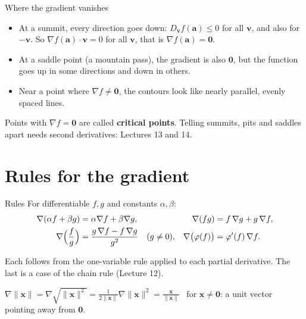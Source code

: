\documentclass[10pt]{wosm-slides}
\newcommand{\norm}[1]{\lVert #1 \rVert}
\newcommand{\vx}{\mathbf{x}}
\newcommand{\va}{\mathbf{a}}
\DeclareRobustCommand{\vv}{\mathbf{v}}
\begin{document}
\begin{frame}{Where the gradient vanishes}
  \begin{itemize}
    \item At a summit, every direction goes down: $D_\vv f(\va) \le 0$ for all $\vv$, and also for
      $-\vv$. So $\nabla f(\va) \cdot \vv = 0$ for all $\vv$, that is $\nabla f(\va) = \mathbf 0$.
    \item At a saddle point (a mountain pass), the gradient is also $\mathbf 0$, but the function
      goes up in some directions and down in others.
    \item Near a point where $\nabla f \ne \mathbf 0$, the contours look like nearly parallel,
      evenly spaced lines.
  \end{itemize}
  \pause
  \begin{remark}
    Points with $\nabla f = \mathbf 0$ are called \textbf{critical points}. Telling summits, pits and
    saddles apart needs second derivatives: Lectures 13 and 14.
  \end{remark}
\end{frame}

\section{Rules for the gradient}

\begin{frame}{Rules}
  For differentiable $f, g$ and constants $\alpha, \beta$:
  \begin{align*}
    \nabla(\alpha f + \beta g) &= \alpha \nabla f + \beta \nabla g, &
    \nabla(fg) &= f\, \nabla g + g\, \nabla f, \\
    \nabla\Bigl(\frac fg\Bigr) &= \frac{g\, \nabla f - f\, \nabla g}{g^2} \quad (g \ne 0), &
    \nabla\bigl(\varphi(f)\bigr) &= \varphi'(f)\, \nabla f .
  \end{align*}
  {\small Each follows from the one-variable rule applied to each partial derivative. The last is
  a case of the chain rule (Lecture 12).\par}
  \pause
  \begin{example}
    $\nabla \norm{\vx} = \nabla \sqrt{\norm{\vx}^2} = \frac{1}{2\norm{\vx}} \nabla \norm{\vx}^2
    = \frac{\vx}{\norm{\vx}}$ \ for $\vx \ne \mathbf 0$: a unit vector pointing away from $\mathbf 0$.
  \end{example}
\end{frame}
\end{document}
